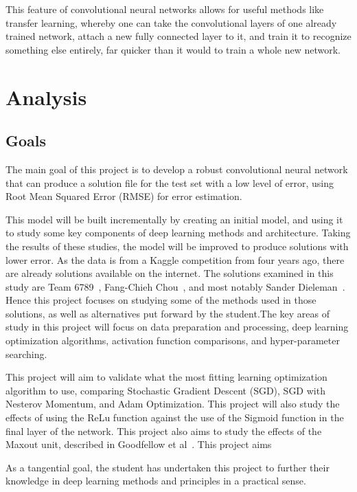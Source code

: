 \documentclass[12pt,a4paper,oneside,oldfontcommands]{memoir}
\begin{document}
This feature of convolutional neural networks allows for useful methods like transfer learning, whereby one can take the convolutional layers of one already trained network, attach a new fully connected layer to it, and train it to recognize something else entirely, far quicker than it would to train a whole new network.

\chapter{Analysis}

\section{Goals}

The main goal of this project is to develop a robust convolutional neural network that can produce a solution file for the test set with a low level of error, using Root Mean Squared Error (RMSE) for error estimation.

This model will be built incrementally by creating an initial model, and using it to study some key components of deep learning methods and architecture. Taking the results of these studies, the model will be improved to produce solutions with lower error. As the data is from a Kaggle competition from four years ago, there are already solutions available on the internet. The solutions examined in this study are Team 6789~\cite{Nguyen}, Fang-Chieh Chou~\cite{Fang}, and most notably Sander Dieleman~\cite{Sanders-GZ}. Hence this project focuses on studying some of the methods used in those solutions, as well as alternatives put forward by the student.The key areas of study in this project will focus on data preparation and processing, deep learning optimization algorithms, activation function comparisons, and hyper-parameter searching.

This project will aim to validate what the most fitting learning optimization algorithm to use, comparing Stochastic Gradient Descent (SGD), SGD with Nesterov Momentum, and Adam Optimization. This project will also study the effects of using the ReLu function against the use of the Sigmoid function in the final layer of the network. This project also aims to study the effects of the Maxout unit, described in Goodfellow et al~\cite{maxout}. This project aims 

As a tangential goal, the student has undertaken this project to further their knowledge in deep learning methods and principles in a practical sense.
\end{document}
